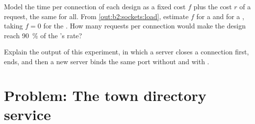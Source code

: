 \begin{exercise}[$\star\star\star$]\label{exo:b2:sockets:11}
Model the time per connection of each design as a fixed cost $f$ plus the cost $r$ of a request, the same for all.
From \cref{out:b2:sockets:load}, estimate $f$ for a  and for a , taking $f = 0$ for the . How
many requests per connection would make the  design reach 90~\% of the 's rate?
\end{exercise}

\begin{exercise}[$\star\star\star$]\label{exo:b2:sockets:12}
Explain the output of this experiment, in which a server closes a connection first, ends, and then a new server binds
the same port without and with .
\end{exercise}

\section{Problem: The town directory service}\label{sec:b2:sockets:problem}

